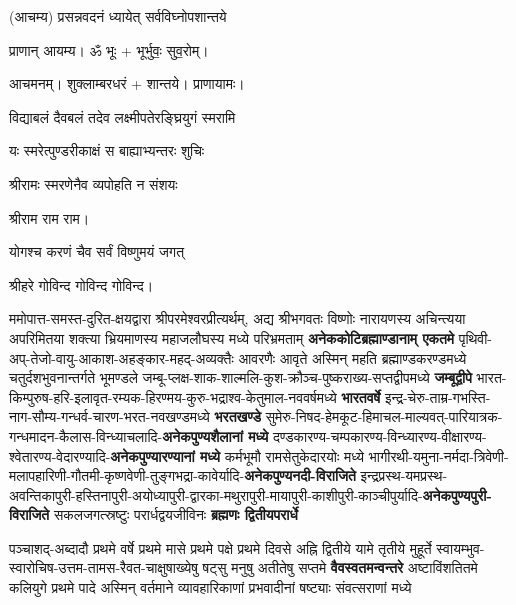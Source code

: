 
\begin{center}
(आचम्य)
{प्रसन्नवदनं ध्यायेत् सर्वविघ्नोपशान्तये}

प्राणान् आयम्य। ॐ भूः + भूर्भुवः॒ सुव॒रोम्।

आचमनम्। शुक्लाम्बरधरं + शान्तये। प्राणायामः।

{विद्याबलं दैवबलं तदेव लक्ष्मीपतेरङ्घ्रियुगं स्मरामि}

{यः स्मरेत्पुण्डरीकाक्षं स बाह्याभ्यन्तरः शुचिः}

{श्रीरामः स्मरणेनैव व्यपोहति न संशयः}

श्रीराम राम राम।

{योगश्च करणं चैव सर्वं विष्णुमयं जगत्}

श्रीहरे गोविन्द गोविन्द गोविन्द।

\end{center}

ममोपात्त-समस्त-दुरित-क्षयद्वारा श्रीपरमेश्वरप्रीत्यर्थम्, अद्य श्रीभगवतः विष्णोः नारायणस्य अचिन्त्यया अपरिमितया शक्त्या भ्रियमाणस्य महाजलौघस्य मध्ये
परिभ्रमताम् \textbf{अनेक\-कोटि\-ब्रह्माण्डा\-नाम् एकतमे}
पृथिवी-अप्-तेजो-वायु-आकाश-अहङ्कार-महद्-अव्यक्तैः आवरणैः आवृते अस्मिन् महति ब्रह्माण्डकरण्डमध्ये
चतुर्दशभुवनान्तर्गते भूमण्डले जम्बू-प्लक्ष-शाक-शाल्मलि-कुश-क्रौञ्च-पुष्कराख्य-सप्तद्वीपमध्ये
\textbf{जम्बूद्वीपे} भारत-किम्पुरुष-हरि-इलावृत-रम्यक-हिरण्मय-कुरु-भद्राश्व-केतुमाल-नववर्षमध्ये \textbf{भारतवर्षे}
इन्द्र-चेरु-ताम्र-गभस्ति-नाग-सौम्य-गन्धर्व-चारण-भरत-नवखण्डमध्ये \textbf{भरतखण्डे}
सुमेरु-निषद-हेमकूट-हिमाचल-माल्यवत्-पारियात्रक-गन्धमादन-कैलास-विन्ध्याचलादि-\textbf{अनेक\-पुण्य\-शैलानां मध्ये}
दण्डकारण्य-चम्पकारण्य-विन्ध्यारण्य-वीक्षारण्य-श्वेतारण्य-वेदारण्यादि-\textbf{अनेक\-पुण्या\-रण्यानां मध्ये}
कर्मभूमौ राम\-सेतु\-केदारयोः मध्ये
भागीरथी-यमुना-नर्मदा-त्रिवेणी-मलापहारिणी-गौतमी-कृष्णवेणी-तुङ्गभद्रा-कावेर्यादि-\textbf{अनेक\-पुण्य\-नदी-विराजिते}
इन्द्रप्रस्थ-यमप्रस्थ-अवन्तिका\-पुरी-हस्तिना\-पुरी-अयोध्या\-पुरी-द्वारका-मथुरा\-पुरी-माया\-पुरी-काशी\-पुरी-काञ्ची\-पुर्यादि-\textbf{अनेक\-पुण्य\-पुरी-विराजिते} 
सकलजगत्स्रष्टुः परार्धद्वयजीविनः \textbf{ब्रह्मणः द्वितीयपरार्धे}

पञ्चाशद्-अब्दादौ प्रथमे वर्षे प्रथमे मासे प्रथमे पक्षे प्रथमे दिवसे अह्नि द्वितीये यामे तृतीये मुहूर्ते
स्वायम्भुव-स्वारोचिष-उत्तम-तामस-रैवत-चाक्षुषाख्येषु षट्सु मनुषु अतीतेषु सप्तमे \textbf{वैवस्वतमन्वन्तरे}
अष्टाविंशतितमे कलियुगे प्रथमे पादे अस्मिन् वर्तमाने व्यावहारिकाणां प्रभवादीनां षष्ट्याः संवत्सराणां मध्ये

